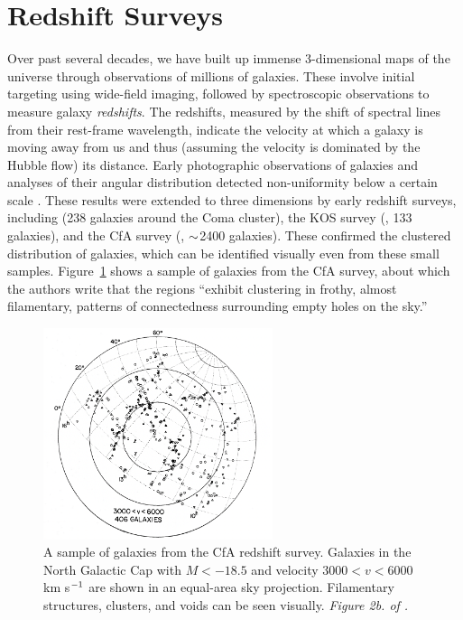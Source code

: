 \section{Redshift Surveys}

Over past several decades, we have built up immense 3-dimensional maps of the universe through observations of millions of galaxies.
These involve initial targeting using wide-field imaging, followed by spectroscopic observations to measure galaxy \emph{redshifts}.
The redshifts, measured by the shift of spectral lines from their rest-frame wavelength, indicate the velocity at which a galaxy is moving away from us and thus (assuming the velocity is dominated by the Hubble flow) its distance.
Early photographic observations of galaxies and  analyses of their angular distribution detected non-uniformity below a certain scale \citep{shapley_survey_1932,hubble_distribution_1934,seldner_new_1977,peebles_galaxy_2001}.
These results were extended to three dimensions by early redshift surveys, including \cite{gregory_comaa1367_1978} (238 galaxies around the Coma cluster), the KOS survey (\citealt{kirshner_million_1981}, 133 galaxies), and the CfA survey (\citealt{davis_survey_1982}, $\mathord{\sim}$2400 galaxies).
These confirmed the clustered distribution of galaxies, which can be identified visually even from these small samples. 
Figure~\ref{fig:cfa_survey} shows a sample of galaxies from the CfA survey, about which the authors write that the regions ``exhibit clustering in frothy, almost filamentary, patterns of connectedness surrounding empty holes on the sky.''

\begin{figure}
    \centering
    \includegraphics[width=0.6\textwidth]{cfa_survey}
    \caption{A sample of galaxies from the CfA redshift survey. Galaxies in the North Galactic Cap with $M<-18.5$ and velocity $3000<v<6000$ km s$^{-1}$ are shown in an equal-area sky projection. Filamentary structures, clusters, and voids can be seen visually. \emph{Figure 2b. of \cite{davis_survey_1982}.}}
    \label{fig:cfa_survey}
\end{figure}

